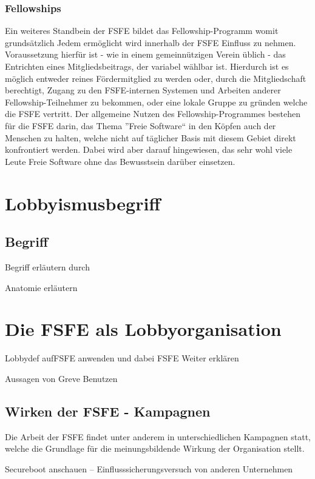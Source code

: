 \subsubsection{Fellowships}
Ein weiteres Standbein der FSFE bildet das Fellowship-Programm womit
grundsätzlich Jedem ermöglicht wird innerhalb der FSFE Einfluss zu nehmen.
Voraussetzung hierfür ist - wie in einem gemeinnützigen Verein üblich - das 
Entrichten eines Mitgliedsbeitrags, der variabel
wählbar ist. Hierdurch ist es möglich entweder reines Fördermitglied zu werden
oder, durch die Mitgliedschaft berechtigt, Zugang zu den FSFE-internen Systemen 
und Arbeiten anderer Fellowship-Teilnehmer zu bekommen, oder eine lokale Gruppe
zu gründen welche die FSFE vertritt. Der allgemeine Nutzen des 
Fellowship-Programmes bestehen für die FSFE darin, das Thema ''Freie Software`` 
in 
den Köpfen auch der Menschen zu halten, welche nicht auf täglicher Basis mit 
diesem Gebiet direkt konfrontiert werden. Dabei wird aber darauf hingewiesen, 
das sehr wohl viele Leute Freie Software ohne das Bewusstsein darüber einsetzen.



\section{Lobbyismusbegriff}
\subsection{Begriff}
\begin{itemize*}
    \item Begriff erläutern durch \cite{LeifSpeth200312}
    \item Anatomie erläutern
\end{itemize*}

\section{Die FSFE als Lobbyorganisation}
\begin{itemize*}
    \item Lobbydef aufFSFE  anwenden und dabei FSFE Weiter erklären
    \item Aussagen von Greve Benutzen \cite{PLGreveInterView}
\end{itemize*}

\subsection{Wirken der FSFE - Kampagnen}
Die Arbeit der FSFE findet unter anderem in unterschiedlichen Kampagnen statt, 
welche die Grundlage für die meinungsbildende Wirkung der Organisation stellt.
\begin{itemize*}
    \item Secureboot anschauen -- Einflusssicherungsversuch von anderen
    Unternehmen
\end{itemize*}

